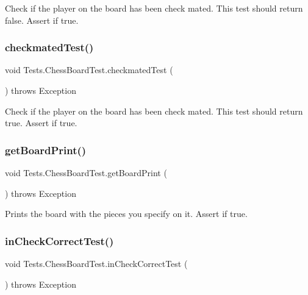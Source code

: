 Check if the player on the board has been check mated. This test should return false. Assert if true. \mbox{\label{class_tests_1_1_chess_board_test_a8083a428a23ac5846f1be101d54e5895}} 
\subsubsection{\texorpdfstring{checkmated\+Test()}{checkmatedTest()}}
{\footnotesize\ttfamily void Tests.\+Chess\+Board\+Test.\+checkmated\+Test (\begin{DoxyParamCaption}{ }\end{DoxyParamCaption}) throws Exception\hspace{0.3cm}{\ttfamily [inline]}}

Check if the player on the board has been check mated. This test should return true. Assert if true. \mbox{\label{class_tests_1_1_chess_board_test_a5c359522c675af1dbd6140bf9a9ae781}} 
\subsubsection{\texorpdfstring{get\+Board\+Print()}{getBoardPrint()}}
{\footnotesize\ttfamily void Tests.\+Chess\+Board\+Test.\+get\+Board\+Print (\begin{DoxyParamCaption}{ }\end{DoxyParamCaption}) throws Exception\hspace{0.3cm}{\ttfamily [inline]}}

Prints the board with the pieces you specify on it. Assert if true. \mbox{\label{class_tests_1_1_chess_board_test_ae52616e4ffccca2eca925939695dc77b}} 
\subsubsection{\texorpdfstring{in\+Check\+Correct\+Test()}{inCheckCorrectTest()}}
{\footnotesize\ttfamily void Tests.\+Chess\+Board\+Test.\+in\+Check\+Correct\+Test (\begin{DoxyParamCaption}{ }\end{DoxyParamCaption}) throws Exception\hspace{0.3cm}{\ttfamily [inline]}}

